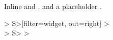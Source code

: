 \documentclass{article}
\begin{document}
Inline  and , and a placeholder .

\begin{beltgrid}[inputs={\beltmapicon{widget}, \beltmapicon{gizmo}}]
> S>[filter=widget, out=right] > \\
> S> >
\end{beltgrid}
\end{document}

